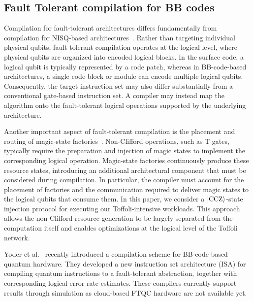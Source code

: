 \documentclass[sigconf]{acmart}
\newcommand{\anik}[1]{%
        \textcolor{blue}{\textbf{Anik:} #1}%
    }
\newcommand{\anik}[1]{}
\begin{document}
\subsection{Fault Tolerant compilation for BB codes}
Compilation for fault-tolerant architectures differs fundamentally from compilation for NISQ-based architectures~\cite{bhaumik2026optimal}. Rather than targeting individual physical qubits, fault-tolerant compilation operates at the logical level, where physical qubits are organized into encoded logical blocks. In the surface code, a logical qubit is typically represented by a code patch, whereas in BB-code-based architectures, a single code block or module can encode multiple logical qubits. Consequently, the target instruction set may also differ substantially from a conventional gate-based instruction set. A compiler may instead map the algorithm onto the fault-tolerant logical operations supported by the underlying architecture.

Another important aspect of fault-tolerant compilation is the placement and routing of magic-state factories~\cite{gameofsurfacecodes}. Non-Clifford operations, such as T gates, typically require the preparation and injection of magic states to implement the corresponding logical operation. Magic-state factories continuously produce these resource states, introducing an additional architectural component that must be considered during compilation. In particular, the compiler must account for the placement of factories and the communication required to deliver magic states to the logical qubits that consume them. In this paper, we consider a $\ket{\mathrm{CCZ}}$-state injection protocol for executing our Toffoli-intensive workloads. This approach allows the non-Clifford resource generation to be largely separated from the computation itself and enables optimizations at the logical level of the Toffoli network.

Yoder et al.~\cite{tourdegross} recently introduced a compilation scheme for BB-code-based quantum hardware. They developed a new instruction set architecture (ISA) for compiling quantum instructions to a fault-tolerant abstraction, together with corresponding logical error-rate estimates. These compilers currently support results through simulation as cloud-based FTQC hardware are not available yet. 

\end{document}
